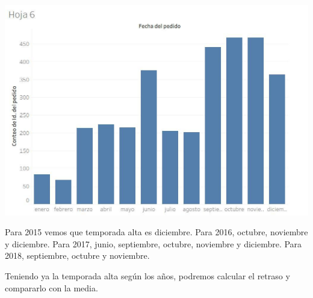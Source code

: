 \documentclass{article}
\begin{document}
\includegraphics[scale=0.25]{imagenes/2018.jpg} 

Para 2015 vemos que temporada alta es diciembre. 
Para 2016, octubre, noviembre y diciembre.
Para 2017, junio, septiembre, octubre, noviembre y diciembre.
Para 2018, septiembre, octubre y noviembre. 

Teniendo ya la temporada alta según los años, podremos calcular el retraso y compararlo con la media.
\end{document}
